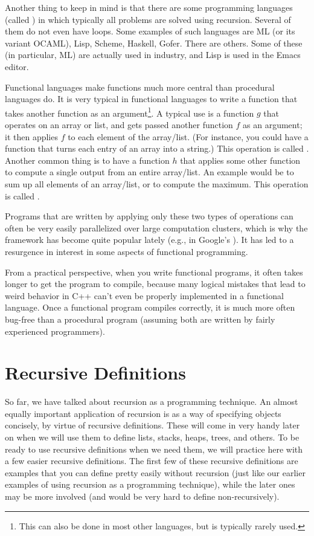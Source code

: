 \medskip

Another thing to keep in mind is that there are some programming
languages (called ) in which typically all
problems are solved using recursion.
Several of them do not even have loops.
Some examples of such languages are ML (or its variant OCAML),
Lisp, Scheme, Haskell, Gofer. There are others.
Some of these (in particular, ML) are actually used in industry,
and Lisp is used in the Emacs editor.

Functional languages make functions much more central than procedural
languages do.
It is very typical in functional languages to write a function that
takes another function as an argument\footnote{This can also be done
  in most other languages, but is typically rarely used.}.
A typical use is a function $g$ that operates on an array or list,
and gets passed another function $f$ as an argument;
it then applies $f$ to each element of the array/list. 
(For instance, you could have a function that turns each entry of an
array into a string.)
This operation is called .
Another common thing is to have a function $h$ that applies some other
function to compute a single output from an entire array/list.
An example would be to sum up all elements of an array/list,
or to compute the maximum.
This operation is called .

Programs that are written by applying only these two types of
operations can often be very easily parallelized over large
computation clusters, which is why the  framework has
become quite popular lately (e.g., in Google's ). 
It has led to a resurgence in interest in some aspects of functional
programming. 

From a practical perspective, when you write functional programs,
it often takes longer to get the program to compile,
because many logical mistakes that lead to weird behavior in C++ can't
even be properly implemented in a functional language.
Once a functional program compiles correctly,
it is much more often bug-free than a procedural program
(assuming both are written by fairly experienced programmers).

\section{Recursive Definitions} \label{sec:recursion:definitions}

So far, we have talked about recursion as a programming technique.
An almost equally important application of recursion is as a way of
specifying objects concisely, by virtue of recursive definitions.
These will come in very handy later on when we will use them to define
lists, stacks, heaps, trees, and others.
To be ready to use recursive definitions when we need them,
we will practice here with a few easier recursive definitions.
The first few of these recursive definitions are examples that you can
define pretty easily without recursion
(just like our earlier examples of using recursion
as a programming technique),
while the later ones may be more involved
(and would be very hard to define non-recursively).

